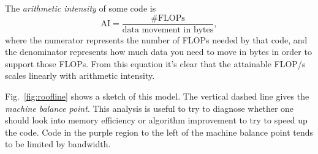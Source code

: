 The {\it arithmetic intensity} of some code is
\begin{equation}
  \text{AI}=\frac{\text{\# FLOPs}}{\text{data movement in bytes}},
\end{equation}
where the numerator represents the number of FLOPs needed by that code, and the
denominator represents how much data you need to move in bytes in order to
support those FLOPs. From this equation it's clear that the attainable
FLOP/s scales linearly with arithmetic intensity.

Fig.~\ref{fig:roofline} shows a sketch of this model. The vertical
dashed line gives the {\it machine balance point}.
This analysis is useful to try to diagnose whether one should look into
memory efficiency or algorithm improvement to try to speed up the code.
Code in the purple region to the left of the machine balance point
tends to be limited by bandwidth.





